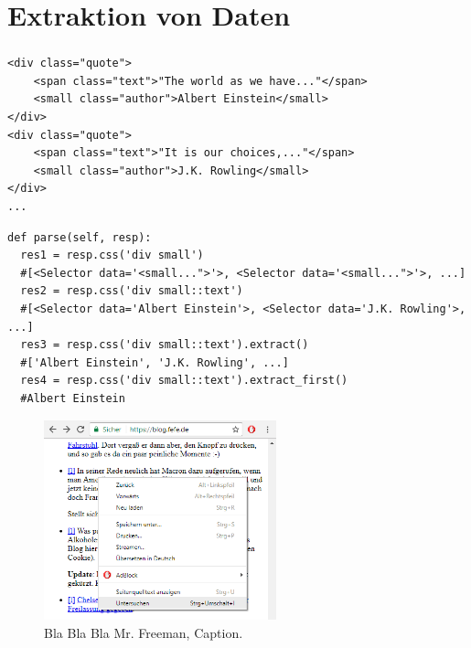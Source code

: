 \documentclass{beamer}
\begin{document}
\section{Extraktion von Daten}
\begin{frame}
	\frametitle{\insertsection{}}
	\begin{lstlisting}[basicstyle=\footnotesize]
<div class="quote">
    <span class="text">"The world as we have..."</span>
    <small class="author">Albert Einstein</small>
</div>
<div class="quote">
    <span class="text">"It is our choices,..."</span>
    <small class="author">J.K. Rowling</small>
</div>
...
	\end{lstlisting}

	
	\begin{lstlisting}[breaklines=true,basicstyle=\footnotesize]
def parse(self, resp):
  res1 = resp.css('div small')
  #[<Selector data='<small...">'>, <Selector data='<small...">'>, ...]
  res2 = resp.css('div small::text')
  #[<Selector data='Albert Einstein'>, <Selector data='J.K. Rowling'>, ...]
  res3 = resp.css('div small::text').extract()
  #['Albert Einstein', 'J.K. Rowling', ...]
  res4 = resp.css('div small::text').extract_first()
  #Albert Einstein
	\end{lstlisting}
	
	\framebreak
	
	\begin{figure}{\textwidth}
		\begin{center}
			\includegraphics[width=0.6\textwidth]{texsrc/HTML_inspect_A}
		\end{center}
		\vspace{-10pt}
		\caption{Bla Bla Bla Mr. Freeman, Caption.} 
		\label{fig:HTML_Inspect_selection}
	\end{figure}
	

\end{frame}
\end{document}
